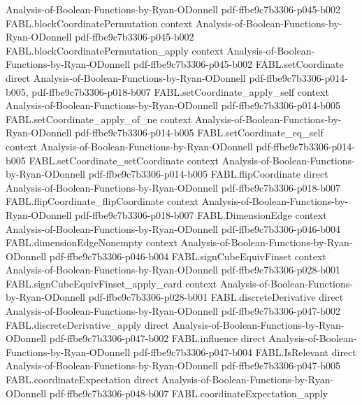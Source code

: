 \begin{theorem}
  {Analysis-of-Boolean-Functions-by-Ryan-ODonnell}
  {pdf-ffbe9c7b3306-p045-b002}
\proofstep
  {FABL.blockCoordinatePermutation}
  {context}
  {Analysis-of-Boolean-Functions-by-Ryan-ODonnell}
  {pdf-ffbe9c7b3306-p045-b002}
\proofstep
  {FABL.blockCoordinatePermutation_apply}
  {context}
  {Analysis-of-Boolean-Functions-by-Ryan-ODonnell}
  {pdf-ffbe9c7b3306-p045-b002}
\proofstep
  {FABL.setCoordinate}
  {direct}
  {Analysis-of-Boolean-Functions-by-Ryan-ODonnell}
  {pdf-ffbe9c7b3306-p014-b005,
    pdf-ffbe9c7b3306-p018-b007}
\proofstep
  {FABL.setCoordinate_apply_self}
  {context}
  {Analysis-of-Boolean-Functions-by-Ryan-ODonnell}
  {pdf-ffbe9c7b3306-p014-b005}
\proofstep
  {FABL.setCoordinate_apply_of_ne}
  {context}
  {Analysis-of-Boolean-Functions-by-Ryan-ODonnell}
  {pdf-ffbe9c7b3306-p014-b005}
\proofstep
  {FABL.setCoordinate_eq_self}
  {context}
  {Analysis-of-Boolean-Functions-by-Ryan-ODonnell}
  {pdf-ffbe9c7b3306-p014-b005}
\proofstep
  {FABL.setCoordinate_setCoordinate}
  {context}
  {Analysis-of-Boolean-Functions-by-Ryan-ODonnell}
  {pdf-ffbe9c7b3306-p014-b005}
\proofstep
  {FABL.flipCoordinate}
  {direct}
  {Analysis-of-Boolean-Functions-by-Ryan-ODonnell}
  {pdf-ffbe9c7b3306-p018-b007}
\proofstep
  {FABL.flipCoordinate_flipCoordinate}
  {context}
  {Analysis-of-Boolean-Functions-by-Ryan-ODonnell}
  {pdf-ffbe9c7b3306-p018-b007}
\proofstep
  {FABL.DimensionEdge}
  {context}
  {Analysis-of-Boolean-Functions-by-Ryan-ODonnell}
  {pdf-ffbe9c7b3306-p046-b004}
\proofstep
  {FABL.dimensionEdgeNonempty}
  {context}
  {Analysis-of-Boolean-Functions-by-Ryan-ODonnell}
  {pdf-ffbe9c7b3306-p046-b004}
\proofstep
  {FABL.signCubeEquivFinset}
  {context}
  {Analysis-of-Boolean-Functions-by-Ryan-ODonnell}
  {pdf-ffbe9c7b3306-p028-b001}
\proofstep
  {FABL.signCubeEquivFinset_apply_card}
  {context}
  {Analysis-of-Boolean-Functions-by-Ryan-ODonnell}
  {pdf-ffbe9c7b3306-p028-b001}
\proofstep
  {FABL.discreteDerivative}
  {direct}
  {Analysis-of-Boolean-Functions-by-Ryan-ODonnell}
  {pdf-ffbe9c7b3306-p047-b002}
\proofstep
  {FABL.discreteDerivative_apply}
  {direct}
  {Analysis-of-Boolean-Functions-by-Ryan-ODonnell}
  {pdf-ffbe9c7b3306-p047-b002}
\proofstep
  {FABL.influence}
  {direct}
  {Analysis-of-Boolean-Functions-by-Ryan-ODonnell}
  {pdf-ffbe9c7b3306-p047-b004}
\proofstep
  {FABL.IsRelevant}
  {direct}
  {Analysis-of-Boolean-Functions-by-Ryan-ODonnell}
  {pdf-ffbe9c7b3306-p047-b005}
\proofstep
  {FABL.coordinateExpectation}
  {direct}
  {Analysis-of-Boolean-Functions-by-Ryan-ODonnell}
  {pdf-ffbe9c7b3306-p048-b007}
\proofstep
  {FABL.coordinateExpectation_apply}

\end{theorem}
